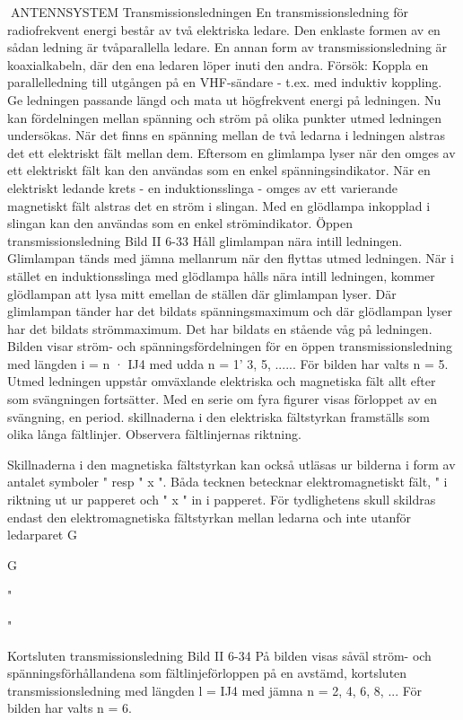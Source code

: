 \documentclass[a4paper,twoside,twocolumn,openright]{book}
\begin{document}
{{{{ANTENNSYSTEM
Transmissionsledningen
En transmissionsledning för radiofrekvent energi består av två elektriska ledare.
Den enklaste formen av en sådan ledning är
tvåparallella ledare. En annan form av transmissionsledning är koaxialkabeln, där den
ena ledaren löper inuti den andra.
Försök: Koppla en parallelledning till utgången på en VHF-sändare - t.ex. med
induktiv koppling. Ge ledningen passande
längd och mata ut högfrekvent energi på
ledningen. Nu kan fördelningen mellan spänning och ström på olika punkter utmed ledningen undersökas. När det finns en spänning mellan de två ledarna i ledningen alstras det ett elektriskt fält mellan dem.
Eftersom en glimlampa lyser när den
omges av ett elektriskt fält kan den användas som en enkel spänningsindikator.
När en elektriskt ledande krets - en induktionsslinga - omges av ett varierande
magnetiskt fält alstras det en ström i slingan.
Med en glödlampa inkopplad i slingan kan
den användas som en enkel strömindikator.
Öppen transmissionsledning
Bild II 6-33
Håll glimlampan nära intill ledningen.
Glimlampan tänds med jämna mellanrum
när den flyttas utmed ledningen.
När i stället en induktionsslinga med glödlampa hålls nära intill ledningen, kommer
glödlampan att lysa mitt emellan de ställen
där glimlampan lyser. Där glimlampan tänder har det bildats spänningsmaximum och
där glödlampan lyser har det bildats strömmaximum. Det har bildats en stående våg
på ledningen.
Bilden visar ström- och spänningsfördelningen för en öppen transmissionsledning med längden i = n · IJ4 med udda n =
1' 3, 5, ......
För bilden har valts n = 5.
Utmed ledningen uppstår omväxlande
elektriska och magnetiska fält allt efter som
svängningen fortsätter. Med en serie om
fyra figurer visas förloppet av en svängning,
en period. skillnaderna i den elektriska fältstyrkan framställs som olika långa fältlinjer.
Observera fältlinjernas riktning.

Skillnaderna i den magnetiska fältstyrkan
kan också utläsas ur bilderna i form av
antalet symboler "
resp " x ". Båda
tecknen betecknar elektromagnetiskt fält, "
i riktning ut ur papperet och " x " in i
papperet. För tydlighetens skull skildras
endast den elektromagnetiska fältstyrkan
mellan ledarna och inte utanför ledarparet
G

G

"

"

Kortsluten transmissionsledning
Bild II 6-34
På bilden visas såväl ström- och spänningsförhållandena som fältlinjeförloppen
på en avstämd, kortsluten transmissionsledning med längden l = IJ4 med jämna n =
2, 4, 6, 8, ... För bilden har valts n = 6.

}}}}
\end{document}
